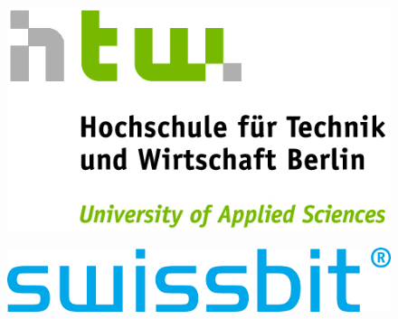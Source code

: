 \begin{titlepage}
	\tgherosfont
	\centering
	
	
	

\begin{minipage}[c]{0.5\textwidth}
	\begin{figure}[H]
		\centering
		\includegraphics[scale=1.5]{images/HTW_Logo.jpg}
		\label{logo_htw2}
	\end{figure}
\end{minipage}
\begin{minipage}[c]{0.4\textwidth}
	\begin{figure}[H]
		\centering
		\includegraphics[scale=0.3]{images/swissbit}
		\label{Swissbit}
	\end{figure}
\end{minipage}


	
	
	\vfill
	{\large \thesisSubject} \\[5mm]
	{\LARGE \color{ctcolortitle}\textbf{\thesisTitle} \\[10mm]}
	{\Large \thesisName} \\
	

\end{titlepage}
